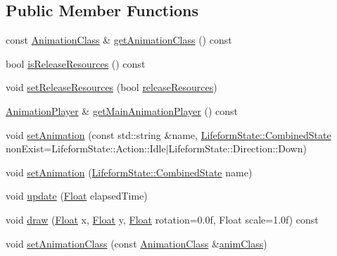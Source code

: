 \subsection*{Public Member Functions}
\begin{DoxyCompactItemize}
\item 
const \hyperlink{classZeta_1_1AnimationClass}{Animation\+Class} \& \hyperlink{classZeta_1_1AnimationHandler_a2245299025192fe0fd523bb740a9e478}{get\+Animation\+Class} () const 
\item 
bool \hyperlink{classZeta_1_1AnimationHandler_a27e43b08d62d413291389fb11bb8f479}{is\+Release\+Resources} () const 
\item 
void \hyperlink{classZeta_1_1AnimationHandler_ab1c932b6678c36a00c762cd26e02332f}{set\+Release\+Resources} (bool \hyperlink{classZeta_1_1AnimationHandler_a8d3b5145dbc58320cbf903810be8166e}{release\+Resources})
\item 
\hyperlink{classZeta_1_1AnimationPlayer}{Animation\+Player} \& \hyperlink{classZeta_1_1AnimationHandler_af845886e40f9145313c7002666e0fcea}{get\+Main\+Animation\+Player} () const 
\item 
void \hyperlink{classZeta_1_1AnimationHandler_a72c87fa76361b8d8f3653d4370fcc5e4}{set\+Animation} (const std\+::string \&name, \hyperlink{classZeta_1_1LifeformState_a877fbe4e8efefd0a5323f950909181b6}{Lifeform\+State\+::\+Combined\+State} non\+Exist=Lifeform\+State\+::\+Action\+::\+Idle$\vert$Lifeform\+State\+::\+Direction\+::\+Down)
\item 
void \hyperlink{classZeta_1_1AnimationHandler_a7eaf5e56f986497be8a626a9e782bd91}{set\+Animation} (\hyperlink{classZeta_1_1LifeformState_a877fbe4e8efefd0a5323f950909181b6}{Lifeform\+State\+::\+Combined\+State} name)
\item 
void \hyperlink{classZeta_1_1AnimationHandler_a12af742e0a71ec9e1314e8e228b686a9}{update} (\hyperlink{namespaceZeta_a1e0a1265f9b3bd3075fb0fabd39088ba}{Float} elapsed\+Time)
\item 
void \hyperlink{classZeta_1_1AnimationHandler_aa39b0ead39df1eb3d677531a1ce582e2}{draw} (\hyperlink{namespaceZeta_a1e0a1265f9b3bd3075fb0fabd39088ba}{Float} x, \hyperlink{namespaceZeta_a1e0a1265f9b3bd3075fb0fabd39088ba}{Float} y, \hyperlink{namespaceZeta_a1e0a1265f9b3bd3075fb0fabd39088ba}{Float} rotation=0.\+0f, Float scale=1.\+0f) const 
\item 
void \hyperlink{classZeta_1_1AnimationHandler_a3f58f7e4ab38df79d2ca6baa68f5e5db}{set\+Animation\+Class} (const \hyperlink{classZeta_1_1AnimationClass}{Animation\+Class} \&\hyperlink{classZeta_1_1AnimationHandler_a7b87046e8ddd604eaba79f49a2ee3de5}{anim\+Class})

\end{DoxyCompactItemize}
